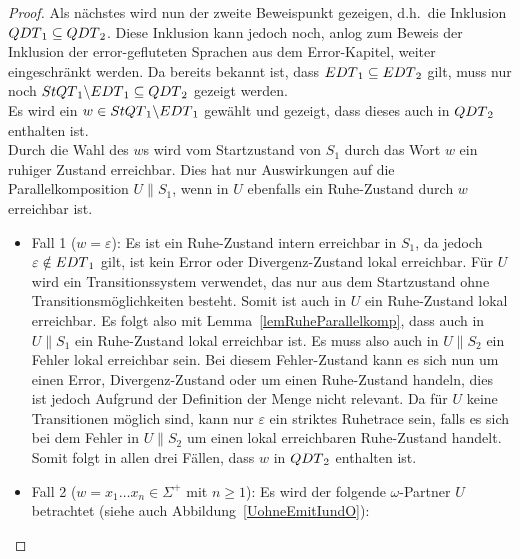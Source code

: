 \begin{proof}
  Als nächstes wird nun der zweite Beweispunkt gezeigen, d.h.\ die Inklusion
  $QDT{}_1\subseteq QDT{}_2$. Diese Inklusion kann jedoch noch, anlog zum
  Beweis der Inklusion der error-gefluteten Sprachen aus dem Error-Kapitel,
  weiter eingeschränkt werden. Da bereits bekannt ist, dass $EDT{}_1\subseteq
  EDT{}_2$ gilt, muss nur noch $StQT{}_1\backslash EDT{}_1\subseteq
  QDT{}_2$ gezeigt werden.\\
  Es wird ein $w\in StQT{}_1\backslash EDT{}_1$ gewählt und gezeigt, dass
  dieses auch in $QDT{}_2$ enthalten ist.\\
  Durch die Wahl des $w$s wird vom Startzustand von $S_1$ durch das Wort $w$
  ein ruhiger Zustand erreichbar. Dies hat nur Auswirkungen auf die
  Parallelkomposition $U\|S_1$, wenn in $U$ ebenfalls ein Ruhe-Zustand durch
  $w$ erreichbar ist.
  \begin{itemize}
    \item Fall 1 ($w=\varepsilon$): Es ist ein Ruhe-Zustand intern erreichbar
      in $S_1$, da jedoch $\varepsilon\notin EDT{}_1$ gilt, ist kein Error
      oder Divergenz-Zustand lokal erreichbar. Für $U$ wird ein
      Transitionssystem verwendet, das nur aus dem Startzustand ohne
      Transitionsmöglichkeiten besteht. Somit ist auch in $U$ ein Ruhe-Zustand
      lokal erreichbar. Es folgt also mit Lemma~\ref{lemRuheParallelkomp}, dass
      auch in $U\|S_1$ ein Ruhe-Zustand lokal erreichbar ist. Es muss also auch
      in $U\|S_2$ ein Fehler lokal erreichbar sein. Bei diesem Fehler-Zustand
      kann es sich nun um einen Error, Divergenz-Zustand oder um einen
      Ruhe-Zustand handeln, dies ist jedoch Aufgrund der Definition der Menge
      \QDT{} nicht relevant. Da für $U$ keine Transitionen möglich sind, kann
      nur $\varepsilon$ ein striktes Ruhetrace sein, falls es sich bei dem
      Fehler in $U\|S_2$ um einen lokal erreichbaren Ruhe-Zustand handelt.
      Somit folgt in allen drei Fällen, dass $w$ in $QDT{}_2$ enthalten ist.
    \item Fall 2 ($w=x_1\dots x_n\in \Sigma ^+$ mit $n\geq 1$): Es wird der
      folgende $\omega$-Partner $U$ betrachtet (siehe auch
      Abbildung~\ref{UohneEmitIundO}):
\end{itemize}
\end{proof}
